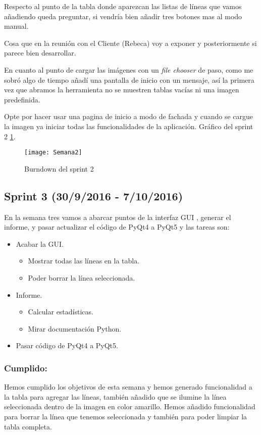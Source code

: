 Respecto al punto de la tabla donde aparezcan las listas de líneas que vamos añadiendo queda preguntar, si vendría bien añadir tres botones mas al modo manual.

Cosa que en la reunión con el Cliente (Rebeca) voy a exponer y posteriormente si parece bien desarrollar.

En cuanto al punto de cargar las imágenes con un \textit{file chooser} de paso, como me sobró algo de tiempo añadí una pantalla de inicio con un mensaje, así la primera vez que abramos la herramienta no se muestren tablas vacías ni una imagen predefinida.

Opte por hacer usar una pagina de inicio a modo de fachada y cuando se cargue la imagen ya iniciar todas las funcionalidades de la aplicación.
Gráfico del sprint 2 \ref{fig:A.2.2}.
\begin{figure}[h]
\centering
\texttt{[image: Semana2]}
\caption{Burndown del sprint 2}
\label{fig:A.2.2}
\end{figure}

\subsection{Sprint 3 (30/9/2016 - 7/10/2016)}
En la semana tres vamos a abarcar puntos de la interfaz GUI , generar el informe, y pasar actualizar  el código de PyQt4 a PyQt5 y las tareas son:

\begin{itemize}
	\item Acabar la GUI.
		\begin{itemize}
			\item Mostrar todas las líneas en la tabla.
			\item Poder borrar la línea seleccionada.
		\end{itemize} 
	\item Informe.
		\begin{itemize}
			\item Calcular estadísticas.
			\item Mirar documentación Python.
		\end{itemize}
	\item Pasar código de PyQt4 a PyQt5.
\end{itemize}
\subsubsection{Cumplido:}
Hemos cumplido los objetivos de esta semana y hemos generado funcionalidad a la tabla para agregar las líneas, también añadido que se ilumine la línea seleccionada dentro de la imagen en color amarillo. Hemos añadido funcionalidad para borrar la línea que tenemos seleccionada y también para poder limpiar la tabla completa.

